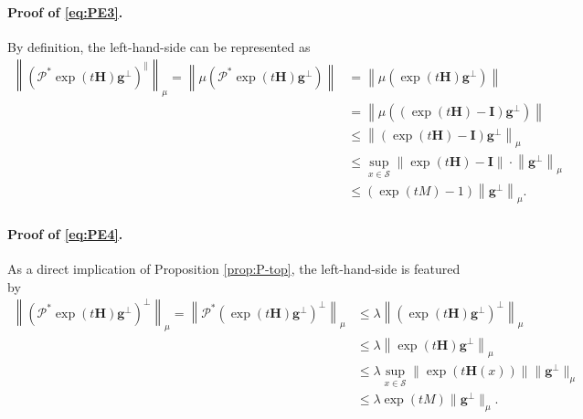 \paragraph{Proof of \eqref{eq:PE3}.} By definition, the left-hand-side can be represented as
\begin{align*}
\left\|\left(\mathcal{P}^* \exp(t\bm{H})\bm{g}^{\perp}\right)^{\parallel}\right\|_{\mu} = \left\|\mu\left(\mathcal{P}^* \exp(t\bm{H})\bm{g}^{\perp}\right)\right\| &= \left\|\mu(\exp(t\bm{H})\bm{g}^{\perp})\right\| \\ 
&= \left\|\mu((\exp(t\bm{H}) - \bm{I}) \bm{g}^{\perp})\right\| \\ 
&\leq \left\|(\exp(t\bm{H}) - \bm{I}) \bm{g}^{\perp}\right\|_{\mu} \\ 
&\leq \sup_{x \in \mathcal{S}} \left\|\exp(t\bm{H}) - \bm{I}\right\| \cdot \left\|\bm{g}^{\perp}\right\|_{\mu} \\ 
&\leq (\exp(tM)-1)  \left\|\bm{g}^{\perp}\right\|_{\mu}.
\end{align*}
\paragraph{Proof of \eqref{eq:PE4}.} As a direct implication of Proposition \ref{prop:P-top}, the left-hand-side is featured by
\begin{align*}
\left\|\left(\mathcal{P}^* \exp(t\bm{H})\bm{g}^{\perp}\right)^{\perp}\right\|_{\mu} = \left\|\mathcal{P}^* \left(\exp(t\bm{H})\bm{g}^{\perp}\right)^{\perp}\right\|_{\mu} 
&\leq \lambda \left\|\left(\exp(t\bm{H})\bm{g}^{\perp}\right)^{\perp}\right\|_{\mu} \\ 
&\leq \lambda \left\|\exp(t\bm{H})\bm{g}^{\perp}\right\|_{\mu} \\ 
&\leq \lambda \sup_{x \in \mathcal{S}}\|\exp(t\bm{H}(x))\| \|\bm{g}^{\perp}\|_{\mu} \\ 
&\leq \lambda \exp(tM) \|\bm{g}^{\perp}\|_{\mu}.
\end{align*}
 

